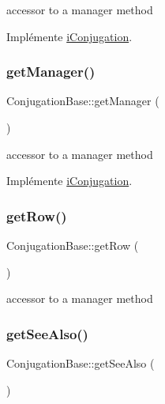 accessor to a manager method 

Implémente \hyperlink{interfacei_conjugation_ab19ceb5ab295fd3d0f862d963379a7e2}{i\+Conjugation}.

\hypertarget{class_conjugation_base_aab285eff4995c059a3aa0abec778a390}{}\label{class_conjugation_base_aab285eff4995c059a3aa0abec778a390} 
\subsubsection{\texorpdfstring{get\+Manager()}{getManager()}}
{\footnotesize\ttfamily Conjugation\+Base\+::get\+Manager (\begin{DoxyParamCaption}{ }\end{DoxyParamCaption})}

accessor to a manager method 

Implémente \hyperlink{interfacei_conjugation_a448829b47813a79d1f8ec65de91e8696}{i\+Conjugation}.

\hypertarget{class_conjugation_base_a0a30ad37c192a95d0986b77999a2ce5d}{}\label{class_conjugation_base_a0a30ad37c192a95d0986b77999a2ce5d} 
\subsubsection{\texorpdfstring{get\+Row()}{getRow()}}
{\footnotesize\ttfamily Conjugation\+Base\+::get\+Row (\begin{DoxyParamCaption}{ }\end{DoxyParamCaption})}

accessor to a manager method \hypertarget{class_conjugation_base_a76d7179c150a4e32fb410d5af9bc388c}{}\label{class_conjugation_base_a76d7179c150a4e32fb410d5af9bc388c} 
\subsubsection{\texorpdfstring{get\+See\+Also()}{getSeeAlso()}}
{\footnotesize\ttfamily Conjugation\+Base\+::get\+See\+Also (\begin{DoxyParamCaption}{ }\end{DoxyParamCaption})}

